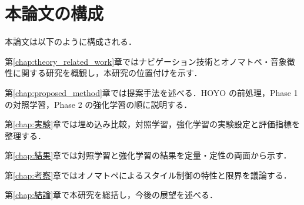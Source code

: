 \section{本論文の構成}
本論文は以下のように構成される．

第\ref{chap:theory_related_work}章ではナビゲーション技術とオノマトペ・音象徴性に関する研究を概観し，本研究の位置付けを示す．

第\ref{chap:proposed_method}章では提案手法を述べる．HOYO の前処理，Phase 1 の対照学習，Phase 2 の強化学習の順に説明する．

第\ref{chap:実験}章では埋め込み比較，対照学習，強化学習の実験設定と評価指標を整理する．

第\ref{chap:結果}章では対照学習と強化学習の結果を定量・定性の両面から示す．

第\ref{chap:考察}章ではオノマトペによるスタイル制御の特性と限界を議論する．

第\ref{chap:結論}章で本研究を総括し，今後の展望を述べる．

